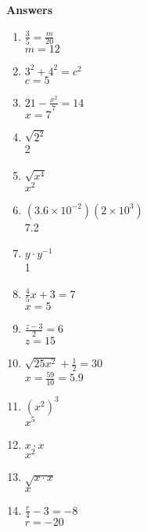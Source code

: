 \documentclass[12pt]{article}
\begin{document}
\Large

\textbf{ Answers }

\begin{multicols}{2}
\begin{enumerate}

	\item \( \frac{3}{5} = \frac{m}{20} \) \\
		\( m = 12 \)

	\item \( 3^{2} + 4^{2} = c^{2} \) \\
		\( c = 5 \)

	\item \( 21 - \frac{x^{2}}{7} = 14 \) \\
		\( x = 7 \)

	\item \( \sqrt{2^{2}} \) \\
		2

	\item \( \sqrt{x^{4}} \) \\
	 	\( x^{2} \)

	\item \( (3.6 \times 10^{-2})(2 \times 10^{3}) \) \\
		7.2

	\item \( y \cdot y^{-1} \) \\
		1

	\item \( \frac{4}{5}x + 3 = 7 \) \\
		\( x = 5 \)

	\item \( \frac{z - 3}{2} = 6 \) \\
		\( z = 15 \)

	\item \( \sqrt{25x^{2}} + \frac{1}{2} = 30 \) \\
		\( x = \frac{59}{10} = 5.9 \)

	\item \( (x^{2})^{3} \) \\
		\( x^{5} \)

	\item \( x \cdot x \) \\
		\( x^{2} \)

	\item \( \sqrt{ x \cdot x } \) \\
		\( x \)

	\item \( \frac{r}{4} - 3 = -8 \) \\
		\( r = -20 \)


\end{enumerate}
\end{multicols}
\end{document}
